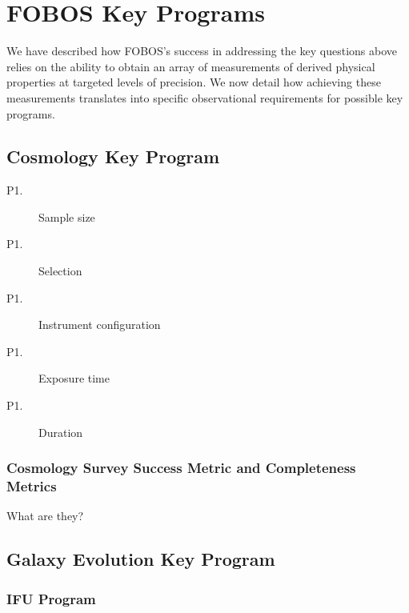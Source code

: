 \documentclass[preprint,11pt]{aastex}
\begin{document}

\section{FOBOS Key Programs}\label{sec:keyPrograms}

We have described how FOBOS's success in addressing the key questions
above relies on the ability to obtain an array of measurements of
derived physical properties at targeted levels of precision.  We now
detail how achieving these measurements translates into specific
observational requirements for possible key programs.

\subsection{Cosmology Key Program}

\begin{description}

\item[P1.] Sample size
\item[P1.] Selection 
\item[P1.] Instrument configuration 
\item[P1.] Exposure time
\item[P1.] Duration

\end{description}

\subsubsection{Cosmology Survey Success Metric and Completeness Metrics}

What are they?


\subsection{Galaxy Evolution Key Program}

\subsubsection{IFU Program}
\end{document}
